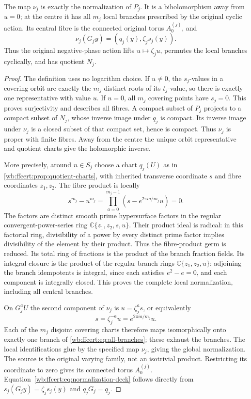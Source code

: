 \begin{theorem}
\label{wb:ffcert:thm:normalization}
The map $\nu_j$ is exactly the normalization of $P_j$. It is a
biholomorphism away from $u=0$; at the centre it has all $m_j$ local
branches prescribed by the original cyclic action. Its central fibre
is the connected original torus $A_0^{(j)}$, and
\[
 \nu_j(G_jy)=(q_j(y),\zeta_js_j(y)).
 \tag{FF27}\label{wb:ffcert:eq:normalization-deck}
\]
Thus the original negative-phase action lifts $u\mapsto\zeta_ju$,
permutes the local branches cyclically, and has quotient $N_j$.
\end{theorem}

\begin{proof}
The definition uses no logarithm choice. If $u\ne0$, the $s_j$-values
in a covering orbit are exactly the $m_j$ distinct roots of its
$t_j$-value, so there is exactly one representative with value $u$.
If $u=0$, all $m_j$ covering points have $s_j=0$. This proves
surjectivity and describes all fibres. A compact subset of $P_j$
projects to a compact subset of $N_j$, whose inverse image under
$q_j$ is compact. Its inverse image under $\nu_j$ is a closed subset
of that compact set, hence is compact. Thus $\nu_j$ is proper with
finite fibres. Away from the centre the unique orbit representative
and quotient charts give the holomorphic inverse.

More precisely, around $n\in S_j$ choose a chart $q_j(U)$ as in
\cref{wb:ffcert:prop:quotient-charts}, with inherited transverse coordinate
$s$ and fibre coordinates $z_1,z_2$. The fibre product is locally
\[
 s^{m_j}-u^{m_j}
   =\prod_{a=0}^{m_j-1}(s-e^{2\pi ia/m_j}u)=0.
 \tag{FF28}\label{wb:ffcert:eq:all-branches}
\]
The factors are distinct smooth prime hypersurface factors in the
regular convergent-power-series ring $\mathbb C\{z_1,z_2,s,u\}$.
Their product ideal is radical: in this factorial ring, divisibility
of a power by every distinct prime factor implies divisibility of the
element by their product. Thus the fibre-product germ is reduced.
Its total ring of fractions is the product of the branch fraction
fields. Its integral closure is the product of the regular branch
rings $\mathbb C\{z_1,z_2,u\}$: adjoining the branch idempotents is
integral, since each satisfies $e^2-e=0$, and each component is
integrally closed. This proves the complete local normalization,
including all central branches.

On $G_j^aU$ the second component of $\nu_j$ is $u=\zeta_j^a s$,
or equivalently
\[
 s=\zeta_j^{-a}u=e^{2\pi ia/m_j}u.
 \tag{FF29}\label{wb:ffcert:eq:branch-identification}
\]
Each of the $m_j$ disjoint covering charts therefore maps
isomorphically onto exactly one branch of
\eqref{wb:ffcert:eq:all-branches}; these exhaust the branches. The
local identifications glue by the specified map $\nu_j$, giving the
global normalization. The source is the original varying family,
not an isotrivial product. Restricting its coordinate to zero gives
its connected torus $A_0^{(j)}$. Equation~\eqref{wb:ffcert:eq:normalization-deck}
follows directly from $s_j(G_jy)=\zeta_js_j(y)$ and $q_jG_j=q_j$.
\end{proof}

